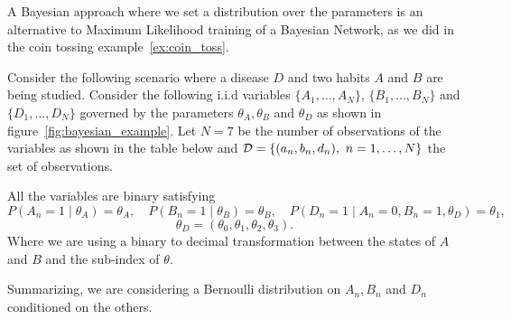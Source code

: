 

A Bayesian approach where we set a distribution over the parameters is an
alternative to Maximum Likelihood training of a Bayesian Network, as we did in
the coin tossing example~\ref{ex:coin_toss}. 

Consider the following scenario where a disease \(D\) and two habits \(A\) and \(B\) are being studied.  Consider the following i.i.d variables \(\{A_{1},\dots, A_{N}\}\), \(\{B_{1},\dots,B_{N}\}\) and \(\{D_{1},\dots, D_{N}\}\) governed by the parameters \(\theta_{A}, \theta_{B}\) and \(\theta_{D}\) as shown in figure~\ref{fig:bayesian_example}. Let \(N = 7\) be the number of observations of the variables as shown in the table below and \( \D = \{(a_n, b_n, d_n),\ n=1,\dots,N\} \) the set of observations.

All the variables are binary satisfying
\[
  P(A_{n} = 1 \mid \theta_{A}) = \theta_{A}, \quad P(B_{n} = 1 \mid \theta_{B}) = \theta_{B}, \quad P(D_{n} = 1 \mid A_{n} = 0, B_{n} = 1, \theta_{D}) = \theta_{1},
\]
\[
  \theta_{D} = ( \theta_{0}, \theta_{1}, \theta_{2},\theta_{3}).
\]
Where we are using a binary to decimal transformation between the states of \(A\) and \(B\) and the sub-index of \(\theta\).

Summarizing, we are considering a Bernoulli distribution on \( A_n, B_n \) and \( D_n \) conditioned on the others. 

